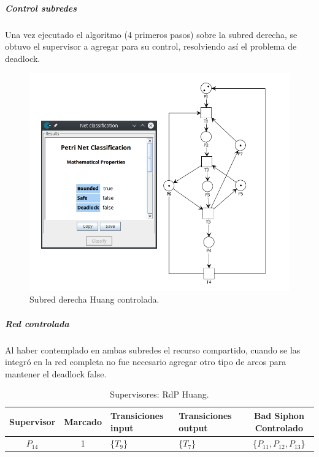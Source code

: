 \subparagraph{Control subredes}
\hfill \break
Una vez ejecutado el algoritmo (4 primeros pasos) sobre la subred derecha, se obtuvo el supervisor a agregar para su control, resolviendo así el problema de deadlock.

 \begin{figure}[H]
	\centering
	\includegraphics[scale=0.5]{Figures/algoritmo3/Huang4.png}
	\caption{Subred derecha Huang controlada.}
	\label{fig:subredder_huang_controlada.}
 \end{figure}

\subparagraph{Red controlada}
\hfill \break
Al haber contemplado en ambas subredes el recurso compartido, cuando se las integró en la red completa no fue necesario agregar otro tipo de arcos para mantener el deadlock false.

\begin{table}[H]
    \small
    \centering
    \begin{tabular}{|c|c|P{2.2cm}|P{2.2cm}|c|}
    \hline
    \textbf{Supervisor} & \textbf{Marcado} & \textbf{Transiciones input} & \textbf{Transiciones output} & \textbf{Bad Siphon Controlado}  \\  \hline
    $P_{14}$ & 1 & \{$T_{9}$\} & \{$T_{7}$\} & \{$P_{11}, P_{12}, P_{13}$\} \\ 
    \hline
    \end{tabular}
    \caption{Supervisores: RdP Huang.}
    \label{tab:Huang-v3}
\end{table}

